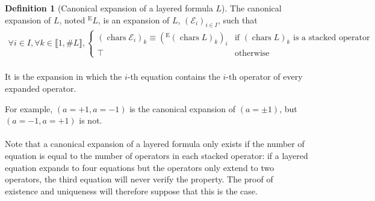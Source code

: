 \documentclass{article}
\DeclareMathOperator{\chars}{chars}
\theoremstyle{definition}
\newtheorem{definition}{Definition}
\begin{document}
\begin{definition}[Canonical expansion of a layered formula $L$]

	The canonical expansion of $L$, noted  ${}^\text{E} L$, is an expansion of $L$,  $(\mathcal{E}_i)_{i\in I}$, such that
	\begin{align*}
		\forall i\in I, \forall k\in \llbracket 1, \#L\rrbracket, \begin{cases}
			(\chars \mathcal{E}_i)_k \equiv ({}^\text{E} (\chars L)_k)_i &\text{if $(\chars L)_k$ is a stacked operator} \\
			\top &\text{otherwise}
		\end{cases}
	\end{align*}

	\paragraph{}
	It is the expansion in which the $i$-th equation contains the $i$-th operator of every expanded operator.

	For example, $(a = +1, a = -1)$ is the canonical expansion of  $(a = \pm 1)$, but $(a = -1, a = +1)$ is not.

	\paragraph{}
	Note that a canonical expansion of a layered formula only exists if the number of equation is equal to the number of operators in each stacked operator:
	if a layered equation expands to four equations but the operators only extend to two operators, the third equation will never verify the property.
	The proof of existence and uniqueness will therefore suppose that this is the case.
\end{definition}
\end{document}
